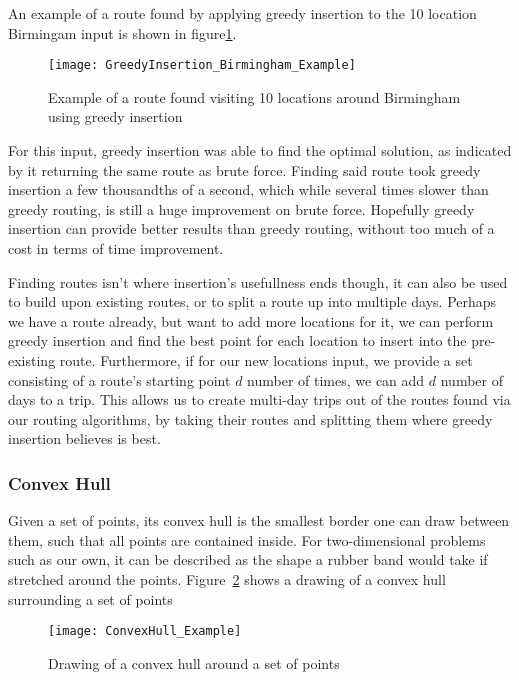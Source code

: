 \noindent
An example of a route found by applying greedy insertion to the 10 location Birmingam input is shown in figure\ref{fig:GreedyInsertion_Birmingham_Example}.
\begin{figure}
    \centering
    \texttt{[image: GreedyInsertion\_Birmingham\_Example]}
    \caption{Example of a route found visiting 10 locations around Birmingham using greedy insertion}
    \label{fig:GreedyInsertion_Birmingham_Example}
\end{figure}

\noindent
For this input, greedy insertion was able to find the optimal solution, as indicated by it returning the same route
as brute force.
Finding said route took greedy insertion a few thousandths of a second, which while several times slower than greedy
routing, is still a huge improvement on brute force.
Hopefully greedy insertion can provide better results than greedy routing, without too much of a cost in terms of
time improvement.

Finding routes isn't where insertion's usefullness ends though, it can also be used to build upon existing routes,
or to split a route up into multiple days.
Perhaps we have a route already, but want to add more locations for it, we can perform greedy insertion and find the
best point for each location to insert into the pre-existing route.
Furthermore, if for our new locations input, we provide a set consisting of a route's starting point $d$ number of
times, we can add $d$ number of days to a trip.
This allows us to create multi-day trips out of the routes found via our routing algorithms, by taking their routes
and splitting them where greedy insertion believes is best.

\subsubsection{Convex Hull}\label{subsubsec:convex-hull}
Given a set of points, its convex hull is the smallest border one can draw between them, such that all points are
contained inside.
For two-dimensional problems such as our own, it can be described as the shape a rubber band would take if stretched 
around the points.
Figure~\ref{fig:ConvexHull_Example} shows a drawing of a convex hull surrounding a set of points
\begin{figure}
    \centering
    \texttt{[image: ConvexHull\_Example]}
    \caption{Drawing of a convex hull around a set of points}
    \label{fig:ConvexHull_Example}
\end{figure}

